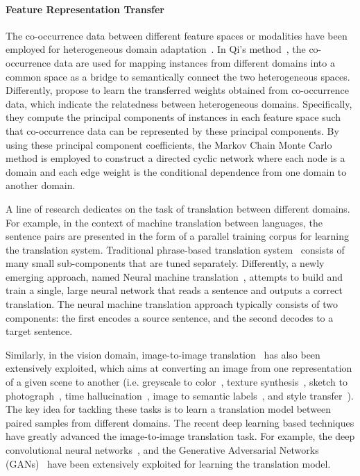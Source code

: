 \documentclass[prodmode]{acmsmall}  %
\begin{document}
\paragraph{Feature Representation Transfer}
The co-occurrence data between different feature spaces or modalities have been employed  for heterogeneous domain adaptation~\cite{Qi2011a,Yang2016}. In Qi's method~\cite{Qi2011a}, the co-occurrence data are used for mapping instances from different domains into a common space as a bridge to semantically connect the two heterogeneous spaces. Differently,  propose to learn the transferred weights obtained from co-occurrence data, which indicate the relatedness between heterogeneous domains. Specifically, they compute the principal components of instances in each feature space such that co-occurrence data can be represented by these principal components. By using these principal component coefficients, the Markov Chain Monte Carlo method is employed to construct a directed cyclic network where each node is a domain and each edge weight is the conditional dependence from one domain to another domain.


A line of research dedicates on the task of translation between different domains. For example, in the context of machine translation between languages, the sentence pairs are presented in the form of a parallel training corpus for learning the translation system. Traditional phrase-based translation system~\cite{Koehn2003} consists of many small sub-components that are tuned separately. Differently, a newly emerging approach, named Neural machine translation~\cite{Kalchbrenner2013,Sutskever2014,Cho2014,Bahdanau2015}, attempts to build and train a single, large neural network that reads a sentence and outputs a correct translation. The neural machine translation approach typically consists of two components: the first encodes a source sentence, and the second decodes to a target sentence. 

Similarly, in the vision domain, image-to-image translation~\cite{Isola2017} has also been extensively exploited, which aims at converting an image from one representation of a given scene to another
(i.e. greyscale to color~\cite{Isola2017}, texture synthesis~\cite{Efros2001,Hertzmann2001,Li2016}, sketch to photograph~\cite{Chen2009a,Isola2017}, time hallucination~\cite{Shih2013,Laffont2014,Isola2017}, image to semantic labels~\cite{Long2015b,Eigen2015,Xie2015}, and style transfer~\cite{Li2016,Wang2016b,Gatys2016,Johnson2016,Zhang2016c}).
The key idea for tackling these tasks is to learn a translation model between paired samples from different domains. The recent deep learning based techniques have greatly advanced the image-to-image translation task. For example, the deep convolutional neural networks~\cite{Long2015b,Xie2015,Eigen2015,Gatys2016,Johnson2016,Zhang2016c}, and the Generative Adversarial Networks (GANs)~\cite{Wang2016b,Li2016,Isola2017} have been extensively exploited for learning the translation model. 
\end{document}
